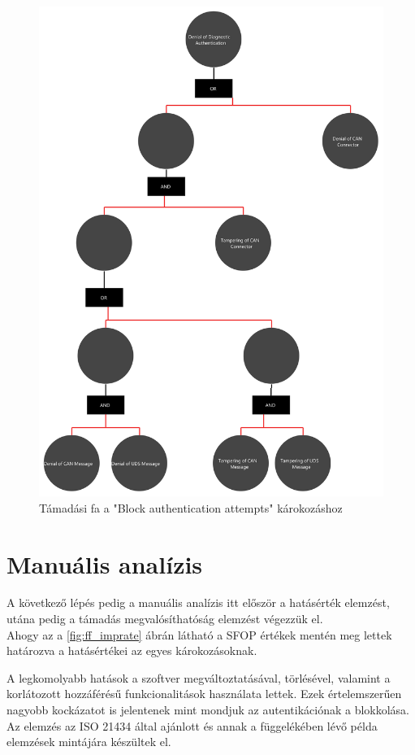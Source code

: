 \begin{figure}[!ht]
	\centering
	\includegraphics[width=120mm, keepaspectratio]{figures/AT-SECDIAG-02.png}
	\caption{Támadási fa a "Block authentication attempts" károkozáshoz} 
	\label{fig:ff_block_auth}
\end{figure}

\section{Manuális analízis}

A következő lépés pedig a manuális analízis itt először a hatásérték elemzést, utána pedig a támadás megvalósíthatóság elemzést végezzük el.\\

Ahogy az a \ref{fig:ff_imprate} ábrán látható a SFOP értékek mentén meg lettek határozva a hatásértékei az egyes károkozásoknak.

A legkomolyabb hatások a szoftver megváltoztatásával, törlésével, valamint a korlátozott hozzáférésű funkcionalitások használata lettek. Ezek értelemszerűen nagyobb kockázatot is jelentenek mint mondjuk az autentikációnak a blokkolása. Az elemzés az ISO 21434 \cite{ISO21434} által ajánlott és annak a függelékében lévő példa elemzések mintájára készültek el.\\

